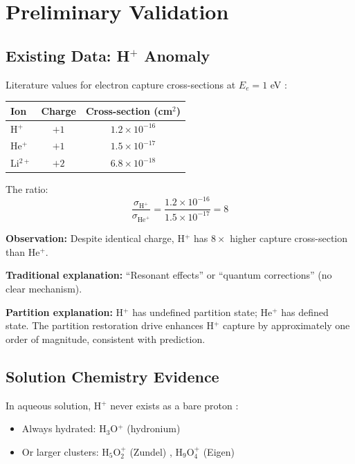 \documentclass[twocolumn,10pt,a4paper]{article}
\theoremstyle{definition}
\theoremstyle{remark}
\begin{document}
\section{Preliminary Validation}
\label{sec:validation}

\subsection{Existing Data: H$^+$ Anomaly}

Literature values for electron capture cross-sections at $E_e = 1$ eV \cite{janev1987}:

\begin{center}
\begin{tabular}{lcc}
\toprule
Ion & Charge & Cross-section (cm$^2$) \\
\midrule
H$^+$ & $+1$ & $1.2 \times 10^{-16}$ \\
He$^+$ & $+1$ & $1.5 \times 10^{-17}$ \\
Li$^{2+}$ & $+2$ & $6.8 \times 10^{-18}$ \\
\bottomrule
\end{tabular}
\end{center}

The ratio:
\begin{equation}
    \frac{\sigma_{\text{H}^+}}{\sigma_{\text{He}^+}} = \frac{1.2 \times 10^{-16}}{1.5 \times 10^{-17}} = 8
\end{equation}

\textbf{Observation:} Despite identical charge, H$^+$ has $8\times$ higher capture cross-section than He$^+$.

\textbf{Traditional explanation:} ``Resonant effects'' or ``quantum corrections'' (no clear mechanism).

\textbf{Partition explanation:} H$^+$ has undefined partition state; He$^+$ has defined state. The partition restoration drive enhances H$^+$ capture by approximately one order of magnitude, consistent with prediction.

\subsection{Solution Chemistry Evidence}

In aqueous solution, H$^+$ never exists as a bare proton \cite{marx2006}:
\begin{itemize}
    \item Always hydrated: H$_3$O$^+$ (hydronium)
    \item Or larger clusters: H$_5$O$_2^+$ (Zundel) \cite{zundel1968}, H$_9$O$_4^+$ (Eigen) \cite{eigen1964}
\end{itemize}
\end{document}
